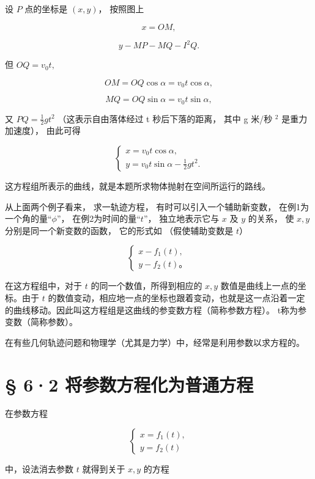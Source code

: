 设 \(P\) 点的坐标是 \((x, y)\)， 按照图上

\[
x = OM,
\]

\[
y - MP - MQ - I^{2} Q.
\]

但 \(OQ = v_{0}t,\)

\[
OM = OQ \cos \alpha = v_{0} t \cos \alpha,
\]

\[
MQ = OQ \sin \alpha = v_{0} t \sin \alpha,
\]

又 \(PQ = \frac{1}{2} gt^2\) （这表示自由落体经过 t 秒后下落的距离，
其中 g 米/秒 \(^{2}\) 是重力加速度）， 由此可得

\[
\left\{ \begin{array}{l} x = v_{0} t \cos \alpha, \\ y = v_{0} t \sin \alpha - \frac {1}{2} g t^{2}. \end{array} \right.
\]

这方程组所表示的曲线，就是本题所求物体抛射在空间所运行的路线。

从上面两个例子看来， 求一轨迹方程， 有时可以引入一个辅助新变数，
在例1为一个角的量``\(\phi\)''， 在例2为时间的量``\(t\)''，
独立地表示它与 \(x\) 及 \(y\) 的关系， 使 \(x, y\)
分别是同一个新变数的函数， 它的形式如 （假使辅助变数是 \(t\)）

\[
\left\{ \begin{array}{l} x - f_{1} (t), \\ y - f_{2} (t)\text{。} \end{array} \right.
\]

在这方程组中，对于 \(t\) 的同一个数值，所得到相应的 \(x, y\)
数值是曲线上一点的坐标。由于 \(t\)
的数值变动，相应地一点的坐标也跟着变动，也就是这一点沿着一定的曲线移动。因此叫这方程组是这曲线的参变数方程（简称参数方程）。
t称为参变数（简称参数）。

在有些几何轨迹问题和物理学（尤其是力学）中，经常是利用参数以求方程的。

\section{§ 6·2
将参数方程化为普通方程}\label{ux5c06ux53c2ux6570ux65b9ux7a0bux5316ux4e3aux666eux901aux65b9ux7a0b}

在参数方程

\[
\left\{ \begin{array}{l} x = f_{1} (t), \\ y = f_{2} (t) \end{array} \right. \tag {1}
\]

中，设法消去参数 \(t\) 就得到关于 \(x, y\) 的方程

